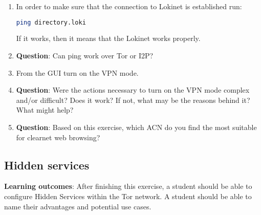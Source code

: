 \begin{enumerate}
    \item In order to make sure that the connection to Lokinet is established run:
    \begin{lstlisting}[language=bash]
    ping directory.loki
    \end{lstlisting}
    If it works, then it means that the Lokinet works properly.
    \item \textbf{Question}: Can ping work over Tor or I2P?
    \item From the GUI turn on the VPN mode.
    \item \textbf{Question}: Were the actions necessary to turn on the VPN mode complex and/or difficult? Does it work? If not, what may be the reasons behind it? What might help?
    \item \textbf{Question}: Based on this exercise, which ACN do you find the most suitable for clearnet web browsing?
\end{enumerate}


\subsection{Hidden services}
\textbf{Learning outcomes}: After finishing this exercise, a student should be able to configure Hidden Services within the Tor network. A student should be able to name their advantages and potential use cases.

